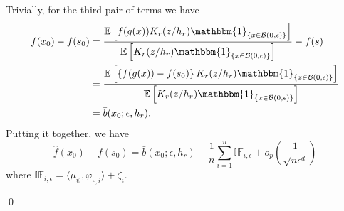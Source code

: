 \documentclass[11pt]{article}
\begin{document}
\begin{appendices}
\begin{equation*}
\end{equation*}
Trivially, for the third pair of terms we have
\begin{align*}
    \bar{f}(x_0) - f(s_0) &= \frac{\mathbb{E}\left[f(g(x))K_r(z/h_r)\mathbbm{1}_{\{x\in \mathcal{B}(0, \epsilon)\}}\right]}{\mathbb{E}\left[K_r(z/h_r)\mathbbm{1}_{\{x\in \mathcal{B}(0, \epsilon)\}}\right]} - f(s) \\
    &= \frac{\mathbb{E}\left[\left\{f(g(x)) - f(s_0)\right\}K_r(z/h_r)\mathbbm{1}_{\{x\in \mathcal{B}(0, \epsilon)\}}\right]}{\mathbb{E}\left[K_r(z/h_r)\mathbbm{1}_{\{x\in \mathcal{B}(0, \epsilon)\}}\right]}\\
    &= \bar{b}(x_0; \epsilon, h_r).
\end{align*}
Putting it together, we have 
\begin{equation*}
    \hat{f}(x_0) - f(s_0) = \bar{b}(x_0; \epsilon, h_r) + \frac{1}{n}\sum_{i = 1}^n\mathbb{IF}_{i, \epsilon} + o_p\left(\frac{1}{\sqrt{n\epsilon^d}}\right)
\end{equation*}
where $\mathbb{IF}_{i, \epsilon} = \langle \mu_{\psi}, \varphi_{\epsilon, i}\rangle + \zeta_i.$

\qed{}


\end{appendices}
\end{document}
